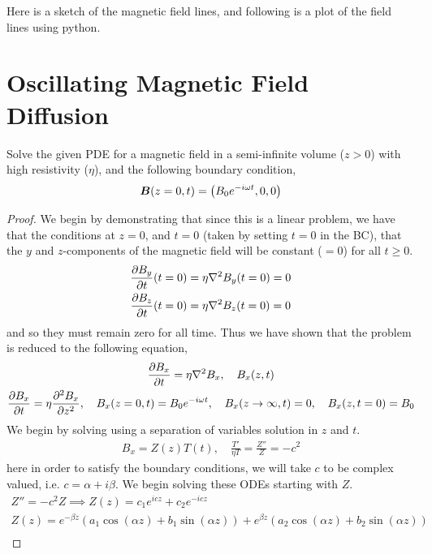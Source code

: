 \documentclass{article}
\begin{document}
Here is a sketch of the magnetic field lines, and following is a plot of the
field lines using python. 


\section{Oscillating Magnetic Field Diffusion}

Solve the given PDE for a magnetic field in a semi-infinite volume ($z > 0$)
with high resistivity ($\eta$), and the following boundary condition,
\begin{gather*}
    \boldsymbol{B}(z=0,t) = \left(B_0e^{-i\omega t}, 0, 0\right)
\end{gather*}

\begin{proof}
    We begin by demonstrating that since this is a linear problem, we have that
    the conditions at $z = 0$, and $t = 0$ (taken by setting $t = 0$ in the BC),
    that the $y$ and $z$-components of the magnetic field will be constant ($ =
    0$) for all $t \ge 0$. 
    \begin{gather*}
        \frac{\partial B_y}{\partial t}(t = 0) = \eta \nabla^2B_y(t = 0) = 0\\
        \frac{\partial B_z}{\partial t}(t = 0) = \eta \nabla^2B_z(t = 0) = 0
    \end{gather*}
    and so they must remain zero for all time. Thus we have shown that the
    problem is reduced to the following equation, 
    \begin{gather*}
        \frac{\partial B_x}{\partial t} = \eta \nabla^2B_x, \quad B_x(z,t)\\
        \frac{\partial B_x}{\partial t} = \eta \frac{\partial^2 B_x}{\partial z^2}, \quad B_x(z=0,t) = B_0e^{-i\omega t},
        \quad B_x(z\to\infty,t) = 0, \quad B_x(z, t=0) = B_0
    \end{gather*}
    We begin by solving using a separation of variables solution in $z$ and
    $t$. 
    \begin{gather*}
        B_x = Z(z)T(t), \quad \frac{T'}{\eta T} = \frac{Z''}{Z} = -c^2
    \end{gather*}
    here in order to satisfy the boundary conditions, we will take $c$ to be
    complex valued, i.e. $c = \alpha + i\beta$. We begin solving these ODEs starting with
    $Z$. 
    \begin{gather*}
        Z'' = -c^2Z \implies Z(z) = c_1e^{icz} + c_2e^{-icz}\\
        Z(z) = e^{-\beta z}\left(a_1\cos(\alpha z) + b_1\sin(\alpha z)\right) +
        e^{\beta z}\left(a_2\cos(\alpha z) + b_2\sin(\alpha z)\right) \\

\end{gather*}
\end{proof}
\end{document}
